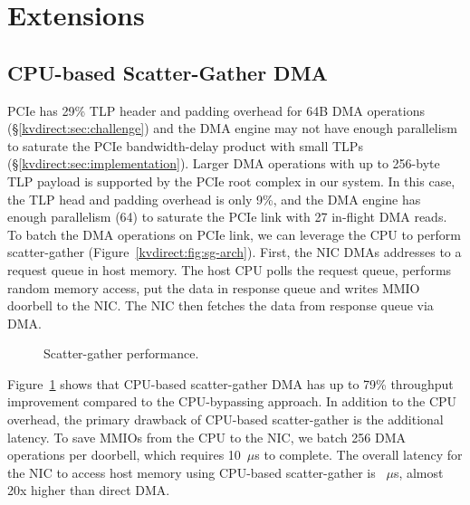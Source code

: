 \section{Extensions}
\label{kvdirect:sec:extensions}

\subsection{CPU-based Scatter-Gather DMA}

PCIe has 29\% TLP header and padding overhead for 64B DMA operations (\S\ref{kvdirect:sec:challenge}) and the DMA engine may not have enough parallelism to saturate the PCIe bandwidth-delay product with small TLPs (\S\ref{kvdirect:sec:implementation}).
Larger DMA operations with up to 256-byte TLP payload is supported by the PCIe root complex in our system. In this case, the TLP head and padding overhead is only 9\%, and the DMA engine has enough parallelism (64) to saturate the PCIe link with 27 in-flight DMA reads.
To batch the DMA operations on PCIe link, we can leverage the CPU to perform scatter-gather (Figure~\ref{kvdirect:fig:sg-arch}).
First, the NIC DMAs addresses to a request queue in host memory. The host CPU polls the request queue, performs random memory access, put the data in response queue and writes MMIO doorbell to the NIC. The NIC then fetches the data from response queue via DMA.

\begin{figure}[t]
\centering
{}
\caption{Scatter-gather performance.}
\label{kvdirect:fig:scatter-gather}

\end{figure}

Figure~\ref{kvdirect:fig:scatter-gather} shows that CPU-based scatter-gather DMA has up to 79\% throughput improvement compared to the CPU-bypassing approach.
In addition to the CPU overhead, the primary drawback of CPU-based scatter-gather is the additional latency.
To save MMIOs from the CPU to the NIC, we batch 256 DMA operations per doorbell, which requires 10~$\mu$s to complete.
The overall latency for the NIC to access host memory using CPU-based scatter-gather is ~$\mu$s, almost 20x higher than direct DMA.

